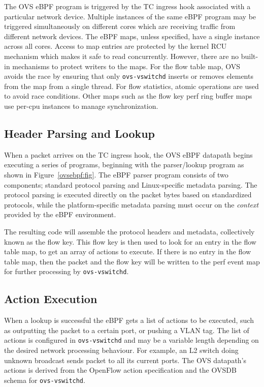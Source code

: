 \documentclass[10pt,numbers,reprint]{sigplanconf}
\begin{document}
The OVS eBPF program is triggered by the TC ingress hook associated with a
particular network device. Multiple instances of the same eBPF program
may be triggered simultaneously on different cores which are receiving traffic
from different network devices.  The eBPF maps, unless specified, have a single
instance across all cores.  Access to map entries are protected by the kernel
RCU~\cite{rcu} mechanism which makes it safe to read concurrently.  However,
there are no built-in mechanisms to protect writers to the maps.
For the flow table map, OVS avoids the race by ensuring that
only \verb+ovs-vswitchd+ inserts or removes elements from the map from a single
thread.  For flow statistics, atomic operations are used to avoid race
conditions.  Other maps such as the flow key perf ring buffer maps use
per-cpu instances to manage synchronization.

\subsection{Header Parsing and Lookup}
\label{parsing}
When a packet arrives on the TC ingress hook, the OVS eBPF datapath begins
executing a series of programs, beginning with the parser/lookup program
as shown in Figure~\ref{ovsebpf:fig}.  The eBPF parser program
consists of two components; standard protocol parsing and Linux-specific
metadata parsing.  The protocol parsing is executed directly on the packet
bytes based on standardized protocols, while the platform-specific metadata
parsing must occur on the {\em context} provided by the eBPF environment.

The resulting code will assemble the protocol headers and metadata,
collectively known as the flow key. This flow key is then used to look for an
entry in the flow table map, to get an array of actions to execute. If there is
no entry in the flow table map, then the packet and the flow key will be
written to the perf event map for further processing by \verb+ovs-vswitchd+.

\subsection{Action Execution}
\label{execution}
When a lookup is successful the eBPF gets a list of actions to be executed,
such as outputting the packet to a certain port, or pushing a VLAN tag. The
list of actions is configured in \verb+ovs-vswitchd+ and may be a variable
length depending on the desired network processing behaviour. For example, an
L2 switch doing unknown broadcast sends packet to all its current ports.  The
OVS datapath's actions is derived from the OpenFlow action specification and
the OVSDB schema for \verb+ovs-vswitchd+.
\end{document}
